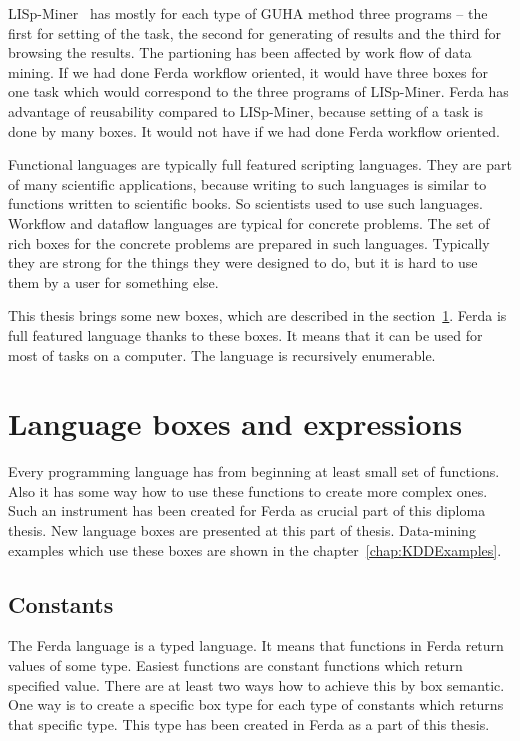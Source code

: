 \documentclass[a4paper,12pt]{book}
\begin{document}
LISp-Miner~\cite{LISp-Miner} has mostly for each type of GUHA method three programs -- the first for setting of the task, the second for generating of results and the third for browsing the results. The partioning has been affected by work flow of data mining. If we had done Ferda workflow oriented, it would have three boxes for one task which would correspond to the three programs of LISp-Miner. Ferda has advantage of reusability compared to LISp-Miner, because setting of a task is done by many boxes. It would not have if we had done Ferda workflow oriented. 

Functional languages are typically full featured scripting languages. They are part of many scientific applications, because writing to such languages is similar to functions written to scientific books. So scientists used to use such languages. Workflow and dataflow languages are typical for concrete problems. The set of rich boxes for the concrete problems are prepared in such languages. Typically they are strong for the things they were designed to do, but it is hard to use them by a user for something else.

This thesis brings some new boxes, which are described in the section~\ref{sectionNewBoxes}. Ferda is full featured language thanks to these boxes. It means that it can be used for most of tasks on a computer. The language is recursively enumerable.

\section{Language boxes and expressions}
\label{sectionNewBoxes}
Every programming language has from beginning at least small set of functions. Also it has some way how to use these functions to create more complex ones. Such an instrument has been created for Ferda as crucial part of this diploma thesis. New language boxes are presented at this part of thesis. Data-mining examples which use these boxes are shown in the chapter~\ref{chap:KDDExamples}.

\subsection{Constants}
The Ferda language is a typed language. It means that functions in Ferda return values of some type. Easiest functions are constant functions which return specified value. There are at least two ways how to achieve this by box semantic. One way is to create a specific box type for each type of constants which returns that specific type. This type has been created in Ferda as a part of this thesis.
\end{document}
